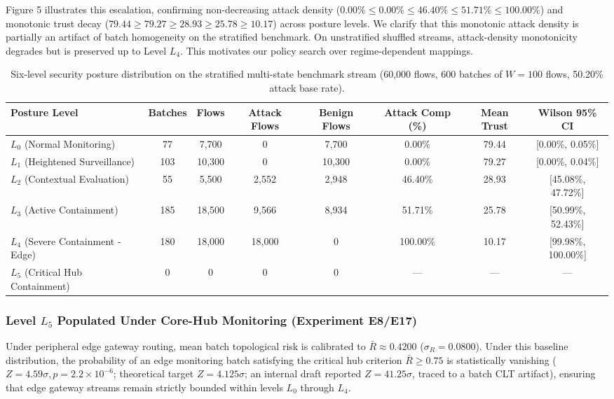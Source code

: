 \documentclass[journal,10pt,onecolumn]{IEEEtran}
\begin{document}
Figure 5 illustrates this escalation, confirming non-decreasing attack density ($0.00\% \le 0.00\% \le 46.40\% \le 51.71\% \le 100.00\%$) and monotonic trust decay ($79.44 \ge 79.27 \ge 28.93 \ge 25.78 \ge 10.17$) across posture levels. We clarify that this monotonic attack density is partially an artifact of batch homogeneity on the stratified benchmark. On unstratified shuffled streams, attack-density monotonicity degrades but is preserved up to Level $L_4$. This motivates our policy search over regime-dependent mappings.

\begin{table}[t]
\caption{Six-level security posture distribution on the stratified multi-state benchmark stream (60,000 flows, 600 batches of $W=100$ flows, 50.20\% attack base rate).}
\label{tab:posture_balanced}
\centering
\small
\begin{tabular}{lccccccc}
\toprule
\textbf{Posture Level} & \textbf{Batches} & \textbf{Flows} & \textbf{Attack Flows} & \textbf{Benign Flows} & \textbf{Attack Comp (\%)} & \textbf{Mean Trust} & \textbf{Wilson 95\% CI} \\
\midrule
$L_0$ (Normal Monitoring) & 77 & 7,700 & 0 & 7,700 & 0.00\% & 79.44 & [0.00\%, 0.05\%] \\
$L_1$ (Heightened Surveillance) & 103 & 10,300 & 0 & 10,300 & 0.00\% & 79.27 & [0.00\%, 0.04\%] \\
$L_2$ (Contextual Evaluation) & 55 & 5,500 & 2,552 & 2,948 & 46.40\% & 28.93 & [45.08\%, 47.72\%] \\
$L_3$ (Active Containment) & 185 & 18,500 & 9,566 & 8,934 & 51.71\% & 25.78 & [50.99\%, 52.43\%] \\
$L_4$ (Severe Containment - Edge) & 180 & 18,000 & 18,000 & 0 & 100.00\% & 10.17 & [99.98\%, 100.00\%] \\
$L_5$ (Critical Hub Containment) & 0 & 0 & 0 & 0 & --- & --- & --- \\
\bottomrule
\end{tabular}
\end{table}

\subsubsection{Level $L_5$ Populated Under Core-Hub Monitoring (Experiment E8/E17)}
Under peripheral edge gateway routing, mean batch topological risk is calibrated to $\bar{R} \approx 0.4200$ ($\sigma_R = 0.0800$). Under this baseline distribution, the probability of an edge monitoring batch satisfying the critical hub criterion $\bar{R} \ge 0.75$ is statistically vanishing ($Z = 4.59\sigma, p = 2.2 \times 10^{-6}$; theoretical target $Z = 4.125\sigma$; an internal draft reported $Z = 41.25\sigma$, traced to a batch CLT artifact), ensuring that edge gateway streams remain strictly bounded within levels $L_0$ through $L_4$.
\end{document}
